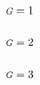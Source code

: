\documentclass[10pt]{article}
\numberwithin{equation}{section}
\newcommand{\G}{{\mbox{\footnotesize{\textit{G}}}}}
\begin{document}
\subsection{$\G = 1$}

\subsection{$\G = 2$}

\subsection{$\G = 3$}

%
\end{document}

